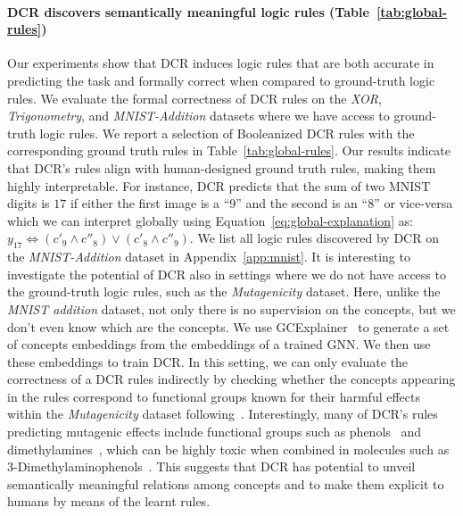 \paragraph{DCR discovers semantically meaningful logic rules (Table~\ref{tab:global-rules})}
Our experiments show that DCR induces logic rules that are both accurate in predicting the task and formally correct when compared to ground-truth logic rules. We evaluate the formal correctness of DCR rules on the \emph{XOR}, \emph{Trigonometry}, and \emph{MNIST-Addition} datasets where we have access to ground-truth logic rules. We report a selection of Booleanized DCR rules with the corresponding ground truth rules in Table~\ref{tab:global-rules}. 
Our results indicate that DCR's rules align with human-designed ground truth rules, making them highly interpretable. For instance, DCR predicts that the sum of two MNIST digits is $17$ if either the first image is a 
``9''
and the second is an 
``8''
 or vice-versa which we can interpret globally using Equation~\ref{eq:global-explanation} as: $y_{17} \Leftrightarrow (c'_9 \land  c''_8) \vee (c'_8 \land  c''_9)$. We list all logic rules discovered by DCR on the \emph{MNIST-Addition} dataset in Appendix~\ref{app:mnist}.
It is interesting to investigate the potential of DCR also in settings where we do not have access to the ground-truth logic rules, such as the \emph{Mutagenicity} dataset. Here, unlike the \textit{MNIST addition} dataset, not only
there is no supervision on the concepts, but we don't even know which are the concepts.
We use GCExplainer~\cite{magister2021gcexplainer} to generate a set of concepts embeddings from the embeddings of a trained GNN. We then use these embeddings to train DCR.
In this setting, we can only evaluate the correctness of a DCR rules indirectly by checking whether the concepts appearing in the rules correspond to functional groups known for their harmful effects within the \emph{Mutagenicity} dataset following~\citet{ying2019gnnexplainer}. Interestingly, many of DCR's rules predicting mutagenic effects include functional groups such as phenols~\cite{hattenschwiler2000role} and dimethylamines~\cite{acgih2016american}, which can be highly toxic when combined in molecules such as \mbox{3-Dimethylaminophenols}~\cite{sabry2011synthesis}. This suggests that DCR has potential to unveil semantically meaningful relations among concepts and to make them explicit to humans by means of the learnt rules. 
